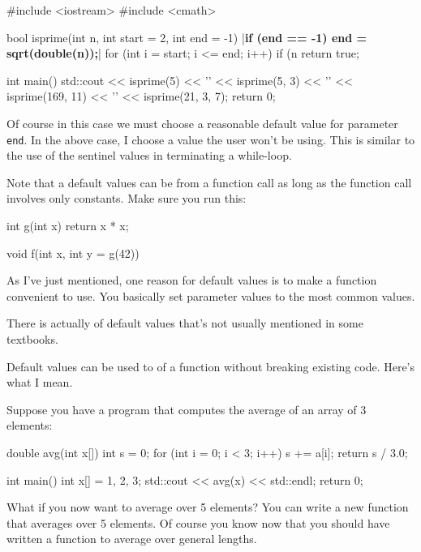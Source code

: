 \begin{consolethree}[escapeinside=||]
#include <iostream>
#include <cmath>

bool isprime(int n, int start = 2, int end = -1)
{
    |\textbf{if (end == -1) end = sqrt(double(n));}|
    for (int i = start; i <= end; i++)
    {
        if (n %
    }
    return true;
}

int main()
{
    std::cout << isprime(5) << '\n'
              << isprime(5, 3) << '\n'
              << isprime(169, 11) << '\n'
              << isprime(21, 3, 7);
    return 0;
}
\end{consolethree}

Of course in this case we must choose a reasonable default value for parameter \texttt{end}. In the above case, I choose a value the user won't be using. This is similar to the use of the sentinel values in terminating a while-loop.

Note that a default values can be from a function call as long as the function call involves only constants. Make sure you run this:

\begin{consolethree}[escapeinside=||]
int g(int x)
{
    return x * x;
}

void f(int x, int y = g(42))
{}
\end{consolethree}


\newpage{}

As I've just mentioned, one reason for default values is to make a function convenient to use. You basically set parameter values to the most common values.

There is actually  of default values that's not usually mentioned in some textbooks.

Default values can be used to  of a function without breaking existing code. Here's what I mean.

Suppose you have a program that computes the average of an array of 3 elements:

\begin{consolethree}[escapeinside=||]
double avg(int x[])
{
    int s = 0;
    for (int i = 0; i < 3; i++)
    {
        s += a[i];
    }
    return s / 3.0;
}

int main()
{
    int x[] = {1, 2, 3};
    std::cout << avg(x) << std::endl;
    return 0;
}
\end{consolethree}

What if you now want to average over 5 elements? You can write a new function that averages over 5 elements. Of course you know now that you should have written a function to average over general lengths.


